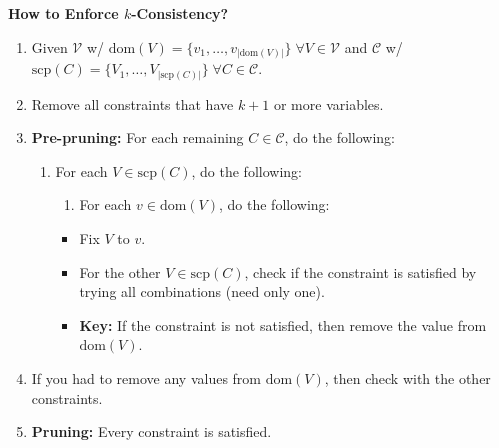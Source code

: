 \begin{process} \textbf{How to Enforce $k$-Consistency?} 
    \begin{enumerate}
        \item Given $\mathcal{V}$ w/ $\text{dom}(V) = \{v_1,\ldots,v_{|\text{dom}(V)|}\} \; \forall V \in \mathcal{V}$ and $\mathcal{C}$ w/ $\text{scp}(C) = \{V_1,\ldots,V_{|\text{scp}(C)|}\} \; \forall C \in \mathcal{C}$.
        \item Remove all constraints that have $k+1$ or more variables.
        \item \textbf{Pre-pruning:} For each remaining $C \in \mathcal{C}$, do the following:
        \begin{enumerate}
            \item For each $V \in \text{scp}(C)$, do the following:
            \begin{enumerate}
                \item For each $v \in \text{dom}(V)$, do the following:
            \end{enumerate}
            \begin{itemize}
                \item Fix $V$ to $v$.
                \item For the other $V \in \text{scp}(C)$, check if the constraint is satisfied by trying all combinations (need only one). 
                \item \textbf{Key:} If the constraint is not satisfied, then remove the value from $\text{dom}(V)$.
            \end{itemize}
        \end{enumerate}
        \item If you had to remove any values from $\text{dom}(V)$, then check with the other constraints.
        \item \textbf{Pruning:} Every constraint is satisfied.
    \end{enumerate}
\end{process}
\newpage

\begin{example}
\end{example}

